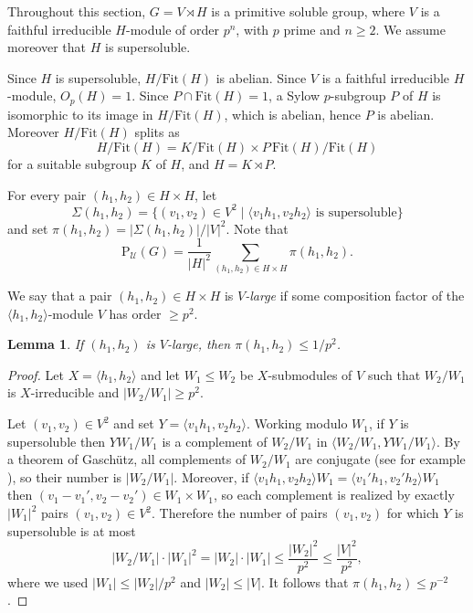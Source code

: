 \documentclass{amsart}
\newtheorem{lemma}{Lemma}
\newcommand{\Psu}{\mathrm{P}_{\mathcal{U}}}
\newcommand{\Fit}{\mathrm{Fit}}
\begin{document}
	Throughout this section, $G = V \rtimes H$ is a primitive 
	soluble group, where $V$ is a faithful irreducible $H$-module 
	of order $p^n$, with $p$ prime and $n \geq 2$. We assume 
	moreover that $H$ is supersoluble.
	
	Since $H$ is supersoluble, $H/\Fit(H)$ is abelian. Since $V$ 
	is a faithful irreducible $H$-module, $O_p(H)=1$. Since 
	$P \cap \Fit(H) = 1$, a Sylow $p$-subgroup $P$ of $H$ is 
	isomorphic to its image in $H/\Fit(H)$, which is abelian, 
	hence $P$ is abelian. Moreover $H/\Fit(H)$ splits as
	$$H/\Fit(H) = K/\Fit(H) \times P\,\Fit(H)/\Fit(H)$$
	for a suitable subgroup $K$ of $H$, and $H = K \rtimes P$.
	
	For every pair $(h_1,h_2) \in H \times H$, let
	$$\Sigma(h_1,h_2) = \{(v_1,v_2)\in V^2 \mid 
	\langle v_1h_1, v_2h_2\rangle \text{ is supersoluble}\}$$
	and set $\pi(h_1,h_2) = |\Sigma(h_1,h_2)|/|V|^2$. Note that
	$$\Psu(G) = \frac{1}{|H|^2} \sum_{(h_1,h_2) \in H \times H} 
	\pi(h_1,h_2).$$
	
	We say that a pair $(h_1,h_2) \in H \times H$ is 
	\textit{$V$-large} if some composition factor of the 
	$\langle h_1,h_2\rangle$-module $V$ has order $\geq p^2$.
	
	\begin{lemma}\label{lem:large}
		If $(h_1,h_2)$ is $V$-large, then $\pi(h_1,h_2) \leq 1/p^2$.
	\end{lemma}
	\begin{proof}
		Let $X = \langle h_1,h_2\rangle$ and let $W_1 \leq W_2$ be 
		$X$-submodules of $V$ such that $W_2/W_1$ is $X$-irreducible 
		and $|W_2/W_1| \geq p^2$.
		
		Let $(v_1,v_2) \in V^2$ and set 
		$Y = \langle v_1h_1, v_2h_2\rangle$. Working modulo $W_1$, 
		if $Y$ is supersoluble then $YW_1/W_1$ is a complement of 
		$W_2/W_1$ in $\langle W_2/W_1, YW_1/W_1\rangle$. By a theorem 
		of Gasch\"{u}tz, all complements of $W_2/W_1$ are conjugate (see for example \cite[Propositon 1.6.8]{dh}), 
		so their number is $|W_2/W_1|$. Moreover, if 
		$\langle v_1h_1, v_2h_2\rangle W_1 = 
		\langle v_1'h_1, v_2'h_2\rangle W_1$ then 
		$(v_1-v_1', v_2-v_2') \in W_1 \times W_1$, so each complement 
		is realized by exactly $|W_1|^2$ pairs $(v_1,v_2) \in V^2$. 
		Therefore the number of pairs $(v_1,v_2)$ for which $Y$ is 
		supersoluble is at most 
		$$|W_2/W_1| \cdot |W_1|^2 = |W_2| \cdot |W_1| \leq 
		\frac{|W_2|^2}{p^2} \leq \frac{|V|^2}{p^2},$$
		where we used $|W_1| \leq |W_2|/p^2$ and $|W_2| \leq |V|$. 
		It follows that $\pi(h_1,h_2) \leq p^{-2}$.
	\end{proof}
	
\end{document}
